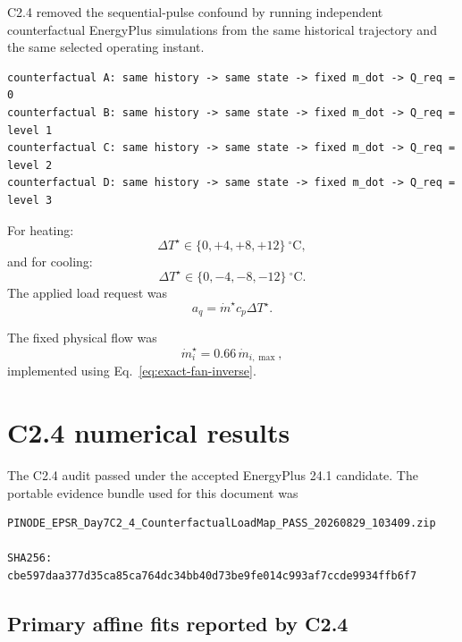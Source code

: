 \documentclass[11pt]{article}
\newcommand{\mdot}{\dot m}
\begin{document}
C2.4 removed the sequential-pulse confound by running independent
counterfactual EnergyPlus simulations from the same historical trajectory and
the same selected operating instant.

\begin{verbatim}
counterfactual A: same history -> same state -> fixed m_dot -> Q_req = 0
counterfactual B: same history -> same state -> fixed m_dot -> Q_req = level 1
counterfactual C: same history -> same state -> fixed m_dot -> Q_req = level 2
counterfactual D: same history -> same state -> fixed m_dot -> Q_req = level 3
\end{verbatim}

For heating:
\begin{equation}
\Delta T^\star \in \{0,+4,+8,+12\}\ ^\circ\mathrm C,
\end{equation}
and for cooling:
\begin{equation}
\Delta T^\star \in \{0,-4,-8,-12\}\ ^\circ\mathrm C.
\end{equation}
The applied load request was
\begin{equation}
a_q
=
\mdot^\star c_p \Delta T^\star.
\label{eq:c24-command}
\end{equation}

The fixed physical flow was
\begin{equation}
\mdot_i^\star
=
0.66\,\mdot_{i,\max},
\label{eq:c24-flowtarget}
\end{equation}
implemented using Eq.~\eqref{eq:exact-fan-inverse}.

\section{C2.4 numerical results}

The C2.4 audit passed under the accepted EnergyPlus 24.1 candidate.  The
portable evidence bundle used for this document was
\begin{verbatim}
PINODE_EPSR_Day7C2_4_CounterfactualLoadMap_PASS_20260829_103409.zip

SHA256:
cbe597daa377d35ca85ca764dc34bb40d73be9fe014c993af7ccde9934ffb6f7
\end{verbatim}

\subsection{Primary affine fits reported by C2.4}
\end{document}
